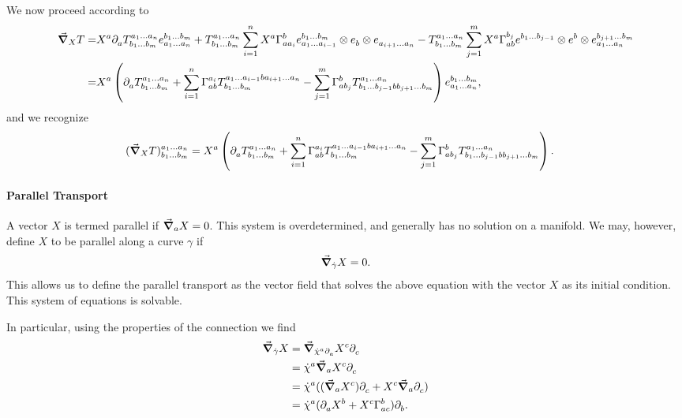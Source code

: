 We now proceed according to
\begin{align*}
	\dcov{X}{T} =& X^{a}\del{a}{\tensor*{T}{^{a_{1}\dots a_{n}}_{b_{1}\dots b_{m}}}}\tensor*{e}{^{b_{1}\dots b_{m}}_{a_{1}\dots a_{n}}} + \tensor*{T}{^{a_{1}\dots a_{n}}_{b_{1}\dots b_{m}}}\sum\limits_{i = 1}^{n}X^{a}\chris{b}{a}{a_{i}}\tensor*{e}{^{b_{1}\dots b_{m}}_{a_{1}\dots a_{i - 1}}}\otimes\tensor*{e}{_{b}}\otimes\tensor*{e}{_{a_{i + 1}\dots a_{n}}} - \tensor*{T}{^{a_{1}\dots a_{n}}_{b_{1}\dots b_{m}}}\sum\limits_{j = 1}^{m}X^{a}\chris{b_{j}}{a}{b}\tensor*{e}{^{b_{1}\dots b_{j - 1}}}\otimes\tensor*{e}{^{b}}\otimes\tensor*{e}{^{b_{j + 1}\dots b_{m}}_{a_{1}\dots a_{n}}} \\
	            =& X^{a}\left(\del{a}{\tensor*{T}{^{a_{1}\dots a_{n}}_{b_{1}\dots b_{m}}}} + \sum\limits_{i = 1}^{n}\chris{a_{i}}{a}{b}\tensor*{T}{^{a_{1}\dots a_{i - 1}ba_{i + 1}\dots a_{n}}_{b_{1}\dots b_{m}}} - \sum\limits_{j = 1}^{m}\chris{b}{a}{b_{j}}\tensor*{T}{^{a_{1}\dots a_{n}}_{b_{1}\dots b_{j - 1}bb_{j + 1}\dots b_{m}}}\right)\tensor*{e}{^{b_{1}\dots b_{m}}_{a_{1}\dots a_{n}}},
\end{align*}
and we recognize
\begin{align*}
	\tensor*{(\dcov{X}{T})}{^{a_{1}\dots a_{n}}_{b_{1}\dots b_{m}}} &= X^{a}\left(\del{a}{\tensor*{T}{^{a_{1}\dots a_{n}}_{b_{1}\dots b_{m}}}} + \sum\limits_{i = 1}^{n}\chris{a_{i}}{a}{b}\tensor*{T}{^{a_{1}\dots a_{i - 1}ba_{i + 1}\dots a_{n}}_{b_{1}\dots b_{m}}} - \sum\limits_{j = 1}^{m}\chris{b}{a}{b_{j}}\tensor*{T}{^{a_{1}\dots a_{n}}_{b_{1}\dots b_{j - 1}bb_{j + 1}\dots b_{m}}}\right).
\end{align*}

\paragraph{Parallel Transport}
A vector $X$ is termed parallel if $\grad_{a}{X} = 0$. This system is overdetermined, and generally has no solution on a manifold. We may, however, define $X$ to be parallel along a curve $\gamma$ if
\begin{align*}
\grad_{\dot{\gamma}}{X} = 0.
\end{align*}
This allows us to define the parallel transport as the vector field that solves the above equation with the vector $X$ as its initial condition. This system of equations is solvable.

In particular, using the properties of the connection we find
\begin{align*}
\dcov{\dot{\gamma}}{X} &= \dcov{\dot{\chi}^{a}\del{a}{}}{X^{c}\del{c}{}} \\
&= \dot{\chi}^{a}\dcov{a}{X^{c}\del{c}{}} \\
&= \dot{\chi}^{a}((\dcov{a}{X^{c}})\del{c}{} + X^{c}\dcov{a}{\del{c}{}}) \\
&= \dot{\chi}^{a}(\del{a}{X^{b}} + X^{c}\chris{b}{a}{c})\del{b}{}.
\end{align*}

